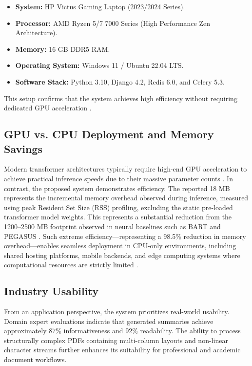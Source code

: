 \documentclass[conference]{IEEEtran}
\begin{document}
\begin{itemize}
\begin{itemize}
    \item \textbf{System:} HP Victus Gaming Laptop (2023/2024 Series).
    \item \textbf{Processor:} AMD Ryzen 5/7 7000 Series (High Performance Zen Architecture).
    \item \textbf{Memory:} 16 GB DDR5 RAM.
    \item \textbf{Operating System:} Windows 11 / Ubuntu 22.04 LTS.
    \item \textbf{Software Stack:} Python 3.10, Django 4.2, Redis 6.0, and Celery 5.3.
\end{itemize}
This setup confirms that the system achieves high efficiency without requiring dedicated GPU acceleration \cite{4}.

\subsection{GPU vs. CPU Deployment and Memory Savings}

Modern transformer architectures typically require high-end GPU acceleration to achieve practical inference speeds due to their massive parameter counts \cite{12}. In contrast, the proposed system demonstrates efficiency. The reported 18 MB represents the incremental memory overhead observed during inference, measured using peak Resident Set Size (RSS) profiling, excluding the static pre-loaded transformer model weights. This represents a substantial reduction from the 1200–2500 MB footprint observed in neural baselines such as BART and PEGASUS \cite{2, 3}. Such extreme efficiency—representing a 98.5\% reduction in memory overhead—enables seamless deployment in CPU-only environments, including shared hosting platforms, mobile backends, and edge computing systems where computational resources are strictly limited \cite{16}.



\subsection{Industry Usability}

From an application perspective, the system prioritizes real-world usability. Domain expert evaluations indicate that generated summaries achieve approximately 87\% informativeness and 92\% readability\cite{9}. The ability to process structurally complex PDFs containing multi-column layouts and non-linear character streams further enhances its suitability for professional and academic document workflows\cite{10}.




\end{itemize}
\end{document}
